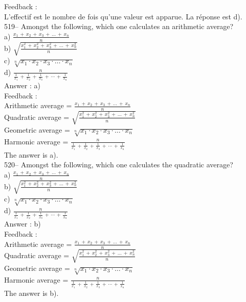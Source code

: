 \documentclass[letterpaper, 12pt]{article}
\begin{document}
Feedback : \\
L'effectif est le nombre de fois qu'une valeur est apparue.  La r\'eponse
est d).\\

519-- Amongst the following, which one calculates an arithmetic average?\\
a) $\frac{x_1\,+\,x_2\,+\,x_3\,+\,\ldots\,+\,x_n}{n}$\\[2mm]
b)
$\sqrt{\frac{x_1^{2}\,+\,x_2^{2}\,+\,x_3^{2}\,+\,\ldots\,+\,x_n^{2}}{n}}$\\[2mm]
c) $\sqrt[n]{x_1 \cdot x_2 \cdot x_3 \cdot \ldots \cdot x_n}$\\[2mm]
d)
$\frac{n}{\frac{1}{x_1}\,+\,\frac{1}{x_2}\,+\,\frac{1}{x_3}\,+\,\cdots\,+\,\frac{1}{x_n}}$\\

Answer : a)\\

Feedback : \\
Arithmetic average =
$\frac{x_1\,+\,x_2\,+\,x_3\,+\,\ldots\,+\,x_n}{n}$\\[2mm]
Quadratic average =
$\sqrt{\frac{x_1^{2}\,+\,x_2^{2}\,+\,x_3^{2}\,+\,\ldots\,+\,x_n^{2}}{n}}$\\[2mm]
Geometric average = $\sqrt[n]{x_1\cdot x_2\cdot x_3 \cdot \ldots \cdot
x_n}$\\[2mm]
Harmonic average =
$\frac{n}{\frac{1}{x_1}\,+\,\frac{1}{x_2}\,+\,\frac{1}{x_3}\,+\,\cdots\,+\,\frac{1}{x_n}}$\\[2mm]
The answer is a).\\

520-- Amongst the following, which one calculates the quadratic average?\\
a) $\frac{x_1\,+\,x_2\,+\,x_3\,+\,\ldots\,+\,x_n}{n}$\\[2mm]
b)
$\sqrt{\frac{x_1^{2}\,+\,x_2^{2}\,+\,x_3^{2}\,+\,\ldots\,+\,x_n^{2}}{n}}$\\[2mm]
c) $\sqrt[n]{x_1 \cdot x_2 \cdot x_3 \cdot \ldots \cdot x_n}$\\[2mm]
d)
$\frac{n}{\frac{1}{x_1}\,+\,\frac{1}{x_2}\,+\,\frac{1}{x_3}\,+\,\cdots\,+\,\frac{1}{x_n}}$\\

Answer : b)\\

Feedback : \\
Arithmetic average =
$\frac{x_1\,+\,x_2\,+\,x_3\,+\,\ldots\,+\,x_n}{n}$\\[2mm]
Quadratic average =
$\sqrt{\frac{x_1^{2}\,+\,x_2^{2}\,+\,x_3^{2}\,+\,\ldots\,+\,x_n^{2}}{n}}$\\[2mm]
Geometric average = $\sqrt[n]{x_1\cdot x_2\cdot x_3 \cdot \ldots \cdot
x_n}$\\[2mm]
Harmonic average =
$\frac{n}{\frac{1}{x_1}\,+\,\frac{1}{x_2}\,+\,\frac{1}{x_3}\,+\,\cdots\,+\,\frac{1}{x_n}}$\\[2mm]The answer is b).\\
\end{document}
